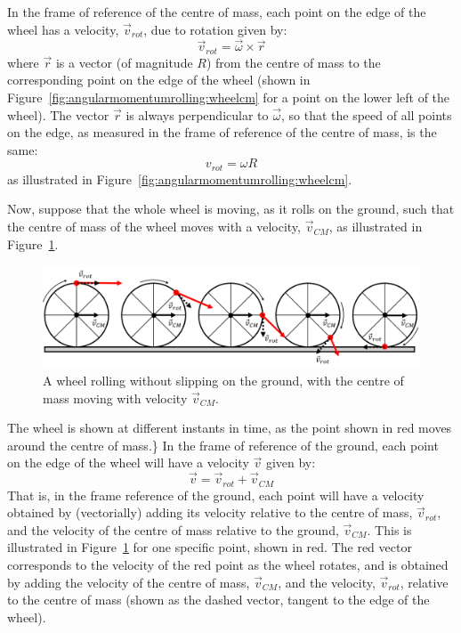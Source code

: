 In the frame of reference of the centre of mass, each point on the edge of the wheel has a velocity, $\vec v_{rot}$, due to rotation given by:
\begin{equation}
\vec v_{rot} = \vec \omega\times \vec r
\end{equation}
where $\vec r$ is a vector (of magnitude $R$) from the centre of mass to the corresponding point on the edge of the wheel (shown in Figure~\ref{fig:angularmomentumrolling:wheelcm} for a point on the lower left of the wheel). The vector $\vec r$ is always perpendicular to $\vec \omega$, so that the speed of all points on the edge, as measured in the frame of reference of the centre of mass, is the same:
\begin{equation}
\label{eq:angularmomentumrolling:vrot}
v_{rot} = \omega R
\end{equation}
as illustrated in Figure~\ref{fig:angularmomentumrolling:wheelcm}.

Now, suppose that the whole wheel is moving, as it rolls on the ground, such that the centre of mass of the wheel moves with a velocity, $\vec v_{CM}$, as illustrated in Figure~\ref{fig:angularmomentumrolling:wheelground}.

\begin{figure}[!htbp]
\centering
\includegraphics[width=0.95\linewidth]{files/wheelground-ea054c3bfbed539816b3e6d137584dbb.png}
\caption[]{A wheel rolling without slipping on the ground, with the centre of mass moving with velocity $\vec v_{CM}$.}
\label{fig:angularmomentumrolling:wheelground}
\end{figure}

The wheel is shown at different instants in time, as the point shown in red moves around the centre of mass.\}
In the frame of reference of the ground, each point on the edge of the wheel will have a velocity $\vec v$ given by:
\begin{equation}
\vec v = \vec v_{rot} + \vec v_{CM}
\end{equation}
That is, in the frame reference of the ground, each point will have a velocity obtained by (vectorially) adding its velocity relative to the centre of mass, $\vec v_{rot}$, and the velocity of the centre of mass relative to the ground, $\vec v_{CM}$. This is illustrated in Figure~\ref{fig:angularmomentumrolling:wheelground} for one specific point, shown in red. The red vector corresponds to the velocity of the red point as the wheel rotates, and is obtained by adding the velocity of the centre of mass, $\vec v_{CM}$, and the velocity, $\vec v_{rot}$, relative to the centre of mass (shown as the dashed vector, tangent to the edge of the wheel).

